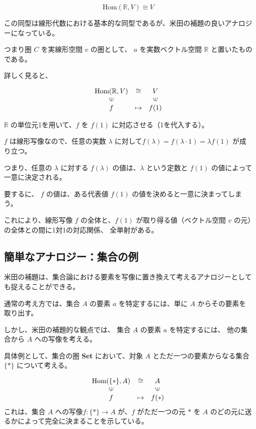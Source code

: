 \documentclass[uplatex,a4j,12pt,dvipdfmx]{jsarticle}
\begin{document}
\[
	\text{Hom}(\mathbb{R},V) \cong V
\]

この同型は線形代数における基本的な同型であるが、米田の補題の良いアナロジーになっている。

つまり圏 $C$ を実線形空間 $v$ の圏として、
$a$ を実数ベクトル空間 $\mathbb{R}$ と置いたものである。


詳しく見ると、

\[
	\begin{array}{ccc}
		\text{Hom}(\mathbb{R},V) & \cong   & V                       \\
		\rotatebox{90}{${\in}$}  &         & \rotatebox{90}{${\in}$} \\
		f                        & \mapsto & f(1)
	\end{array}
\]

$\mathbb{R}$ の単位元1を用いて、$f$ を $f(1)$ に対応させる（1を代入する）。

$f$ は線形写像なので、任意の実数 $\lambda$ に対して$f(\lambda) = f(\lambda \cdot 1) = \lambda f(1)$ が成り立つ。

つまり、任意の $\lambda$ に対する $f(\lambda)$ の値は、$\lambda$ という定数と $f(1)$ の値によって一意に決定される。

要するに、 $f$ の値は、ある代表値 $f(1)$ の値を決めると一意に決まってしまう。

これにより、線形写像 $f$ の全体と、$f(1)$ が取り得る値（ベクトル空間 $v$ の元）の全体との間に1対1の対応関係、
全単射がある。





\subsection{簡単なアナロジー：集合の例}

米田の補題は、集合論における要素を写像に置き換えて考えるアナロジーとしても捉えることができる。

通常の考え方では、集合 $A$ の要素 $a$ を特定するには、単に $A$ からその要素を取り出す。

しかし、米田の補題的な観点では、
集合 $A$ の要素 $a$ を特定するには、
他の集合から $A$ への写像を考える。


具体例として、集合の圏 \textbf{Set} において、対象 $A$ とただ一つの要素からなる集合 $\{*\}$ について考える。

\[
	\begin{array}{ccc} \text{Hom}(\{*\}, A)& \cong & A \\ \rotatebox{90}{${\in}$} && \rotatebox{90}{${\in}$} \\ f& \mapsto & f(*) \end{array}
\]
これは、集合 $A$ への写像$f: \{*\} \to A$ が、$f$ がただ一つの元 $*$ を $A$ のどの元に送るかによって完全に決まることを示している。
\end{document}
